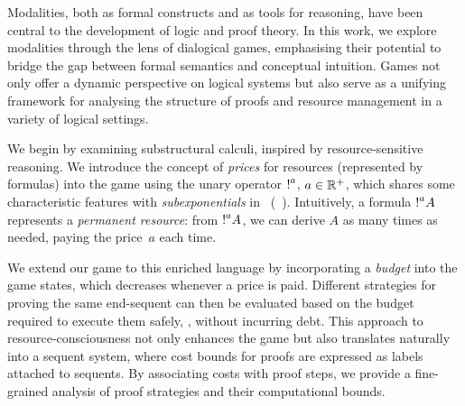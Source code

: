 

Modalities, both as formal constructs and as tools for reasoning, have been central to the development of logic and proof theory. In this work, we explore modalities through the lens of dialogical games, emphasising their potential to bridge the gap between formal semantics and conceptual intuition. Games not only offer a dynamic perspective on logical systems but also serve as a unifying framework for analysing the structure of proofs and resource management in a variety of logical settings.

We begin by examining substructural calculi, inspired by resource-sensitive reasoning. 
%
We introduce the concept of \emph{prices} for resources (represented by formulas) into the game using the unary operator $\hbox{$\mathop{!}^{a}$}$, $a \in \mathbb{R}^+$, which shares some characteristic features with \emph{subexponentials} in \LL\ (\SELL~\cite{DBLP:conf/kgc/DanosJS93,nigam09ppdp}). Intuitively, a formula $\hbox{$\mathop{!}^{a}$}A$ represents a \emph{permanent resource}: from $\hbox{$\mathop{!}^{a}$}A$, we can derive $A$ as many times as needed, paying the price~$a$ each time.

We extend our game to this enriched language by incorporating a \emph{budget} into the game states, which decreases whenever a price is paid. Different strategies for proving the same end-sequent can then be evaluated based on the budget required to execute them safely, \ie, without incurring debt. This approach to resource-consciousness not only enhances the game but also translates naturally into a sequent system, where cost bounds for proofs are expressed as labels attached to sequents. By associating costs with proof steps, we provide a fine-grained analysis of proof strategies and their computational bounds.

